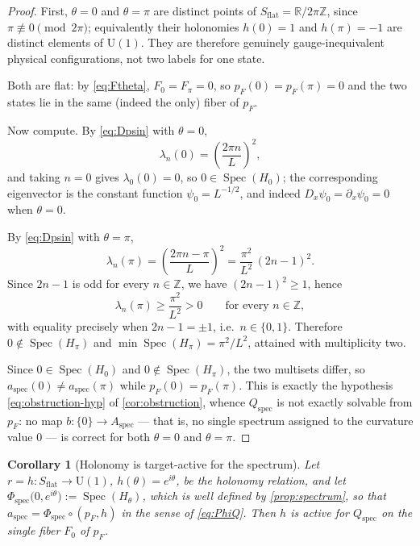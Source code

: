 \documentclass[11pt,reqno]{amsart}
\theoremstyle{plain}
\newtheorem{corollary}[theorem]{Corollary}
\theoremstyle{definition}
\newcommand{\Rr}{\mathbb{R}}
\newcommand{\Zz}{\mathbb{Z}}
\newcommand{\Uone}{\mathrm{U}(1)}
\newcommand{\Src}{S}
\newcommand{\Spec}{\operatorname{Spec}}
\newcommand{\Dx}{D_{x}}
\begin{document}
\begin{proof}
First, $\theta=0$ and $\theta=\pi$ are distinct points of $\Src_{\mathrm{flat}}=\Rr/2\pi\Zz$,
since $\pi\not\equiv 0 \pmod{2\pi}$; equivalently their holonomies $h(0)=1$ and $h(\pi)=-1$ are
distinct elements of $\Uone$. They are therefore genuinely gauge-inequivalent physical
configurations, not two labels for one state.

Both are flat: by \eqref{eq:Ftheta}, $F_0=F_\pi=0$, so $p_F(0)=p_F(\pi)=0$ and the two states lie
in the same (indeed the only) fiber of $p_F$.

Now compute. By \eqref{eq:Dpsin} with $\theta=0$,
\begin{equation*}
\lambda_n(0)=\left(\frac{2\pi n}{L}\right)^{\!2},
\end{equation*}
and taking $n=0$ gives $\lambda_0(0)=0$, so $0\in\Spec(H_0)$; the corresponding eigenvector is
the constant function $\psi_0=L^{-1/2}$, and indeed $\Dx\psi_0=\partial_x\psi_0=0$ when
$\theta=0$.

By \eqref{eq:Dpsin} with $\theta=\pi$,
\begin{equation*}
\lambda_n(\pi)=\left(\frac{2\pi n-\pi}{L}\right)^{\!2}
=\frac{\pi^2}{L^2}\,(2n-1)^2 .
\end{equation*}
Since $2n-1$ is odd for every $n\in\Zz$, we have $(2n-1)^2\geq 1$, hence
\begin{equation}\label{eq:pi-lowerbound}
\lambda_n(\pi)\geq\frac{\pi^2}{L^2}>0
\qquad\text{for every } n\in\Zz,
\end{equation}
with equality precisely when $2n-1=\pm1$, i.e.\ $n\in\{0,1\}$. Therefore $0\notin\Spec(H_\pi)$
and $\min\Spec(H_\pi)=\pi^2/L^2$, attained with multiplicity two.

Since $0\in\Spec(H_0)$ and $0\notin\Spec(H_\pi)$, the two multisets differ, so
$a_{\mathrm{spec}}(0)\neq a_{\mathrm{spec}}(\pi)$ while $p_F(0)=p_F(\pi)$. This is exactly the
hypothesis \eqref{eq:obstruction-hyp} of \cref{cor:obstruction}, whence $Q_{\mathrm{spec}}$ is not
exactly solvable from $p_F$: no map $b\colon\{0\}\to A_{\mathrm{spec}}$ --- that is, no single
spectrum assigned to the curvature value $0$ --- is correct for both $\theta=0$ and $\theta=\pi$.
\end{proof}

\begin{corollary}[Holonomy is target-active for the spectrum]\label{cor:holonomy-active}
Let $r=h\colon\Src_{\mathrm{flat}}\to\Uone$, $h(\theta)=e^{i\theta}$, be the holonomy relation,
and let $\Phi_{\mathrm{spec}}\bigl(0,e^{i\theta}\bigr):=\Spec(H_\theta)$, which is well defined by
\cref{prop:spectrum}, so that $a_{\mathrm{spec}}=\Phi_{\mathrm{spec}}\circ(p_F,h)$ in the sense of
\eqref{eq:PhiQ}. Then $h$ is active for $Q_{\mathrm{spec}}$ on the single fiber $F_0$ of $p_F$.
\end{corollary}
\end{document}
